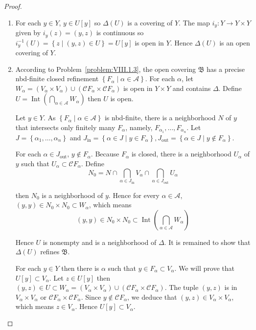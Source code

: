 \begin{proof}
	\begin{enumerate}[label={(\alph*)}]
		\item For each \( y \in Y \), \( y \in U[y] \) so \( \Delta(U) \) is a covering of \( Y \). The map \( i_{y}: Y \to Y \times Y \) given by \( i_{y}(z) = (y, z) \) is continuous so \( i_{y}^{-1}(U) = \left\{ z \mid (y, z) \in U \right\} = U[y] \) is open in \( Y \). Hence \( \Delta(U) \) is an open covering of \( Y \).
		\item According to Problem~\ref{problem:VIII.1.3}, the open covering \( \mathfrak{B} \) has a precise nbd-finite closed refinement \( \left\{ F_{\alpha} \mid \alpha \in \mathscr{A} \right\} \). For each \( \alpha \), let \( W_{\alpha} = (V_{\alpha} \times V_{\alpha}) \cup (\mathscr{C}F_{\alpha} \times \mathscr{C}F_{\alpha}) \) is open in \( Y \times Y \) and contains \( \Delta \). Define \( U = \operatorname{Int}\left( \bigcap_{\alpha\in\mathscr{A}} W_{\alpha} \right) \) then \( U \) is open.

		      Let \( y \in Y \). As \( \left\{ F_{\alpha} \mid \alpha \in \mathscr{A} \right\} \) is nbd-finite, there is a neighborhood \( N \) of \( y \) that intersects only finitely many \( F_{\alpha} \), namely, \( F_{\alpha_{1}}, \ldots, F_{\alpha_{n}} \). Let \( J = \left\{ \alpha_{1}, \ldots, \alpha_{n} \right\} \) and \( J_{\text{in}} = \left\{ \alpha \in J \mid y \in F_{\alpha} \right\}, J_{\text{out}} = \left\{ \alpha \in J \mid y \notin F_{\alpha} \right\} \).

		      For each \( \alpha \in J_{\text{out}} \), \( y \notin F_{\alpha} \). Because \( F_{\alpha} \) is closed, there is a neighborhood \( U_{\alpha} \) of \( y \) such that \( U_{\alpha} \subset \mathscr{C}F_{\alpha} \). Define
		      \[
			      N_{0} = N \cap \bigcap_{\alpha \in J_{\text{in}}} V_{\alpha} \cap \bigcap_{\alpha \in J_{\text{out}}} U_{\alpha}
		      \]

		      then \( N_{0} \) is a neighborhood of \( y \). Hence for every \( \alpha \in \mathscr{A} \), \( (y, y) \in N_{0} \times N_{0} \subset W_{\alpha} \), which means
		      \[
			      (y, y) \in N_{0} \times N_{0} \subset \operatorname{Int}\left(\bigcap_{\alpha\in\mathscr{A}} W_{\alpha}\right)
		      \]

		      Hence \( U \) is nonempty and is a neighborhood of \( \Delta \). It is remained to show that \( \Delta(U) \) refines \( \mathfrak{B} \).

		      For each \( y \in Y \) then there is \( \alpha \) such that \( y \in F_{\alpha} \subset V_{\alpha} \). We will prove that \( U[y] \subset V_{\alpha} \). Let \( z \in U[y] \) then \( (y, z) \in U \subset W_{\alpha} = (V_{\alpha} \times V_{\alpha}) \cup (\mathscr{C}F_{\alpha} \times \mathscr{C}F_{\alpha}) \). The tuple \( (y, z) \) is in \( V_{\alpha} \times V_{\alpha} \) or \( \mathscr{C}F_{\alpha} \times \mathscr{C}F_{\alpha} \). Since \( y \notin \mathscr{C}F_{\alpha} \), we deduce that \( (y, z) \in V_{\alpha} \times V_{\alpha} \), which means \( z \in V_{\alpha} \). Hence \( U[y] \subset V_{\alpha} \).


\end{enumerate}
\end{proof}
